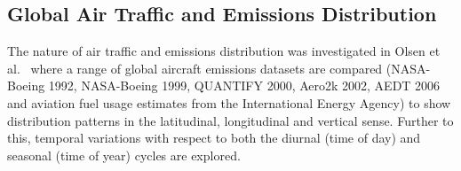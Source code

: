 






\subsection{Global Air Traffic and Emissions Distribution}
The nature of air traffic and emissions distribution was investigated in Olsen et al.\ \cite{Olsen2013} where a range of global aircraft emissions datasets are compared (NASA-Boeing 1992, NASA-Boeing 1999, QUANTIFY 2000, Aero2k 2002, AEDT 2006 and aviation fuel usage estimates from the International Energy Agency) to show distribution patterns in the latitudinal, longitudinal and vertical sense. Further to this, temporal variations with respect to both the diurnal (time of day) and seasonal (time of year) cycles are explored.

